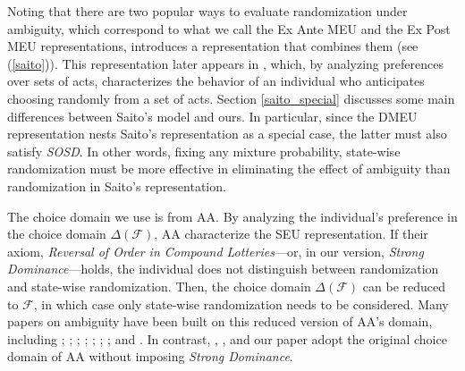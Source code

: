 \documentclass[12pt, notitlepage]{article}
\begin{document}
Noting that there are two popular ways to evaluate randomization under
ambiguity, which correspond to what we call the Ex Ante MEU and the Ex Post
MEU representations, \cite{Saito11} introduces a representation that
combines them (see (\ref{saito})). This representation later appears in \cite%
{Saito15}, which, by analyzing preferences over sets of acts, characterizes
the behavior of an individual who anticipates choosing randomly from a set
of acts. Section \ref{saito_special} discusses some main differences between
Saito's model and ours. In particular, since the DMEU representation nests
Saito's representation as a special case, the latter must also satisfy 
\textit{SOSD}. In other words, fixing any mixture probability, state-wise
randomization must be more effective in eliminating the effect of ambiguity
than randomization in Saito's representation.

The choice domain we use is from AA. By analyzing the individual's
preference in the choice domain $\Delta (\mathcal{F})$, AA characterize the
SEU representation. If their axiom, \textit{Reversal of Order in Compound
Lotteries}---or, in our version, \textit{Strong Dominance}---holds, the
individual does not distinguish between randomization and state-wise
randomization. Then, the choice domain $\Delta (\mathcal{F})$ can be reduced
to $\mathcal{F}$, in which case only state-wise randomization needs to be
considered. Many papers on ambiguity have been built on this reduced version
of AA's domain, including \cite{GilboaSchmeidler89}; \cite{Schmeidler89}; 
\cite{GhirardatoMarinacci01}; \cite{MaccheroniMarinacciRustichini06}; \cite%
{Siniscalchi09}; \cite{CMMM11}; \cite{LehrerTeper11}; and \cite%
{FrickIijimaLeYaouanq19}. In contrast, \cite{Seo09}, \cite{Saito11}, and our
paper adopt the original choice domain of AA without imposing \textit{Strong
Dominance}.
\end{document}
